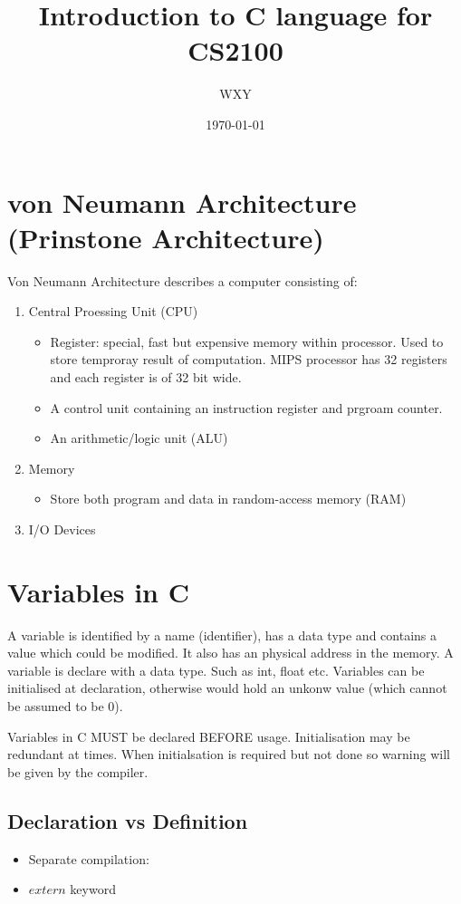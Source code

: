 \documentclass[12pt]{article} %
\title{Introduction to C language for CS2100}
\author{WXY}
\date{\today}
\begin{document}
\maketitle

\tableofcontents %

\section{von Neumann Architecture (Prinstone Architecture)}
Von Neumann Architecture describes a computer consisting of:
\begin{enumerate}
    \item Central Proessing Unit (CPU) 
    \begin{itemize}
        \item Register: special, fast but expensive memory within processor. Used to store temproray result of computation. MIPS processor has 32 registers and each register is of 32 bit wide.
        \item A control unit containing an instruction register and prgroam counter.
        \item An arithmetic/logic unit (ALU)
    \end{itemize}
    \item Memory
    \begin{itemize}
        \item Store both program and data in random-access memory (RAM)
    \end{itemize}
    \item I/O Devices
\end{enumerate}
\section{Variables in C}
A variable is identified by a name (identifier), has a data type and contains a value which could be modified. It also has an physical address in the memory.
A variable is declare with a data type. Such as int, float etc.
Variables can be initialised at declaration, otherwise would hold an unkonw value (which cannot be assumed to be 0).

Variables in C MUST be declared BEFORE usage.
Initialisation may be redundant at times. When initialsation is required but not done so warning will be given by the compiler.
\subsection*{Declaration vs Definition}
\begin{itemize}
    \item Separate compilation: 
    \item \(extern\) keyword
\end{itemize}
\end{document}
